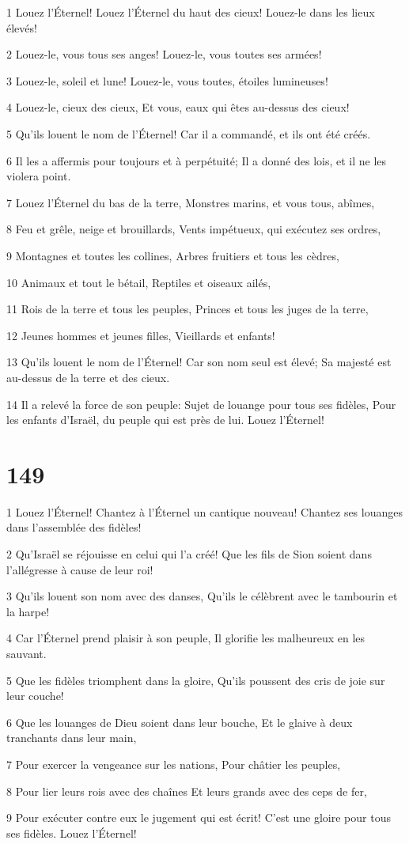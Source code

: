 \par 1 Louez l'Éternel! Louez l'Éternel du haut des cieux! Louez-le dans les lieux élevés!
\par 2 Louez-le, vous tous ses anges! Louez-le, vous toutes ses armées!
\par 3 Louez-le, soleil et lune! Louez-le, vous toutes, étoiles lumineuses!
\par 4 Louez-le, cieux des cieux, Et vous, eaux qui êtes au-dessus des cieux!
\par 5 Qu'ils louent le nom de l'Éternel! Car il a commandé, et ils ont été créés.
\par 6 Il les a affermis pour toujours et à perpétuité; Il a donné des lois, et il ne les violera point.
\par 7 Louez l'Éternel du bas de la terre, Monstres marins, et vous tous, abîmes,
\par 8 Feu et grêle, neige et brouillards, Vents impétueux, qui exécutez ses ordres,
\par 9 Montagnes et toutes les collines, Arbres fruitiers et tous les cèdres,
\par 10 Animaux et tout le bétail, Reptiles et oiseaux ailés,
\par 11 Rois de la terre et tous les peuples, Princes et tous les juges de la terre,
\par 12 Jeunes hommes et jeunes filles, Vieillards et enfants!
\par 13 Qu'ils louent le nom de l'Éternel! Car son nom seul est élevé; Sa majesté est au-dessus de la terre et des cieux.
\par 14 Il a relevé la force de son peuple: Sujet de louange pour tous ses fidèles, Pour les enfants d'Israël, du peuple qui est près de lui. Louez l'Éternel!

\chapter{149}

\par 1 Louez l'Éternel! Chantez à l'Éternel un cantique nouveau! Chantez ses louanges dans l'assemblée des fidèles!
\par 2 Qu'Israël se réjouisse en celui qui l'a créé! Que les fils de Sion soient dans l'allégresse à cause de leur roi!
\par 3 Qu'ils louent son nom avec des danses, Qu'ils le célèbrent avec le tambourin et la harpe!
\par 4 Car l'Éternel prend plaisir à son peuple, Il glorifie les malheureux en les sauvant.
\par 5 Que les fidèles triomphent dans la gloire, Qu'ils poussent des cris de joie sur leur couche!
\par 6 Que les louanges de Dieu soient dans leur bouche, Et le glaive à deux tranchants dans leur main,
\par 7 Pour exercer la vengeance sur les nations, Pour châtier les peuples,
\par 8 Pour lier leurs rois avec des chaînes Et leurs grands avec des ceps de fer,
\par 9 Pour exécuter contre eux le jugement qui est écrit! C'est une gloire pour tous ses fidèles. Louez l'Éternel!

